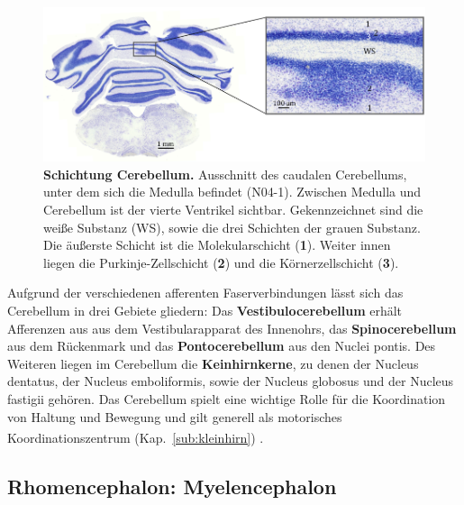\documentclass[12pt,a4paper,pdftex]{article}
\begin{document}
\begin{figure}[H]
    \centering
    \includegraphics[width=\textwidth]{pictures/Bilder_Jule/Ratte/cerebellum.png}
    \caption[Schichtung Cerebellum]{\textbf{Schichtung Cerebellum.} Ausschnitt des caudalen Cerebellums, unter dem sich die Medulla befindet (N04-1). Zwischen Medulla und Cerebellum ist der vierte Ventrikel sichtbar. Gekennzeichnet sind die weiße Substanz (WS), sowie die drei Schichten der grauen Substanz. Die äußerste Schicht ist die Molekularschicht (\textbf{1}). Weiter innen liegen die Purkinje-Zellschicht (\textbf{2}) und die Körnerzellschicht (\textbf{3}).}
    \label{fig:cerebellum_ratte}
\end{figure}

\noindent Aufgrund der verschiedenen afferenten Faserverbindungen lässt sich das Cerebellum in drei Gebiete gliedern: Das \textbf{Vestibulocerebellum} erhält Afferenzen aus aus dem Vestibularapparat des Innenohrs, das \textbf{Spinocerebellum} aus dem Rückenmark und das \textbf{Pontocerebellum} aus den Nuclei pontis. Des Weiteren liegen im Cerebellum die \textbf{Keinhirnkerne}, zu denen der Nucleus dentatus, der Nucleus emboliformis, sowie der Nucleus globosus und der Nucleus fastigii gehören. Das Cerebellum spielt eine wichtige Rolle für die Koordination von Haltung und Bewegung und gilt generell als motorisches Koordinationszentrum (Kap.~\ref{sub:kleinhirn}) \textsuperscript{\cite[7]{trepel2011neuroanatomie}}.




\subsection{Rhomencephalon: Myelencephalon}
\label{subsec:Myelencephalon} 
\end{document}
